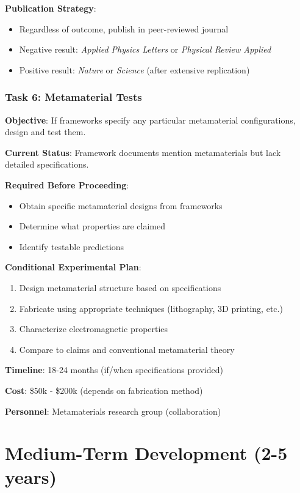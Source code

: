 \textbf{Publication Strategy}:
\begin{itemize}
    \item Regardless of outcome, publish in peer-reviewed journal
    \item Negative result: \textit{Applied Physics Letters} or \textit{Physical Review Applied}
    \item Positive result: \textit{Nature} or \textit{Science} (after extensive replication)
\end{itemize}

\subsubsection{Task 6: Metamaterial Tests}

\textbf{Objective}: If frameworks specify any particular metamaterial configurations, design and test them.

\textbf{Current Status}: Framework documents mention metamaterials but lack detailed specifications.

\textbf{Required Before Proceeding}:
\begin{itemize}
    \item Obtain specific metamaterial designs from frameworks
    \item Determine what properties are claimed
    \item Identify testable predictions
\end{itemize}

\textbf{Conditional Experimental Plan}:
\begin{enumerate}
    \item Design metamaterial structure based on specifications
    \item Fabricate using appropriate techniques (lithography, 3D printing, etc.)
    \item Characterize electromagnetic properties
    \item Compare to claims and conventional metamaterial theory
\end{enumerate}

\textbf{Timeline}: 18-24 months (if/when specifications provided)

\textbf{Cost}: \$50k - \$200k (depends on fabrication method)

\textbf{Personnel}: Metamaterials research group (collaboration)

\section{Medium-Term Development (2-5 years)}

